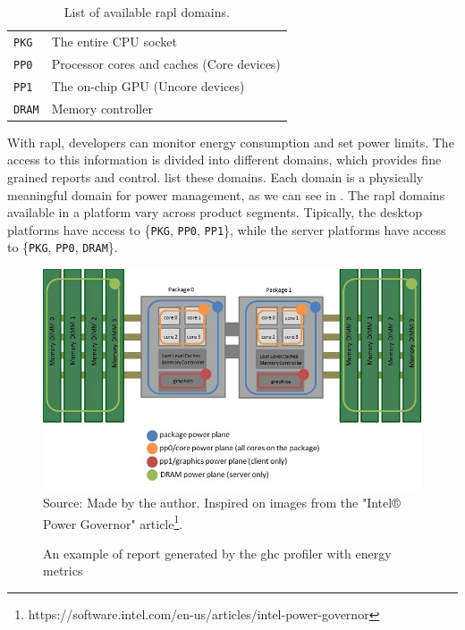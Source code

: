 \begin{table}[htp]
	\caption{List of available \ac{rapl} domains.}
	\label{tbl:rapl-sensors}
	\centering
	\begin{tabular}{ll}
	  \toprule
	  \texttt{PKG}  & The entire CPU socket\\
    \texttt{PP0}  & Processor cores and caches (Core devices)\\
    \texttt{PP1}  & The on-chip GPU (Uncore devices)\\
    \texttt{DRAM} & Memory controller\\
	  \bottomrule
	\end{tabular}
\end{table}

With \ac{rapl}, developers can monitor energy consumption and set power limits. The access to this information is divided into different domains, which provides fine grained reports and control.  list these domains. Each domain is a physically meaningful domain for power management, as we can see in . The \ac{rapl} domains available in a platform vary across product segments. Tipically, the desktop platforms have access to \{\texttt{PKG}, \texttt{PP0}, \texttt{PP1}\}, while the server platforms have access to \{\texttt{PKG}, \texttt{PP0}, \texttt{DRAM}\}.

\begin{savenotes}
\begin{figure}[htp]
  \centering
  \caption{An example of report generated by the \ac{ghc} profiler with energy metrics}
  \includegraphics[width=\columnwidth]{images/power-planes-placeholder}
  \footnotesize{Source: Made by the author. Inspired on images from the "Intel® Power Governor" article\footnote{https://software.intel.com/en-us/articles/intel-power-governor}.}
  \label{fig:power-planes}
\end{figure}
\end{savenotes}

